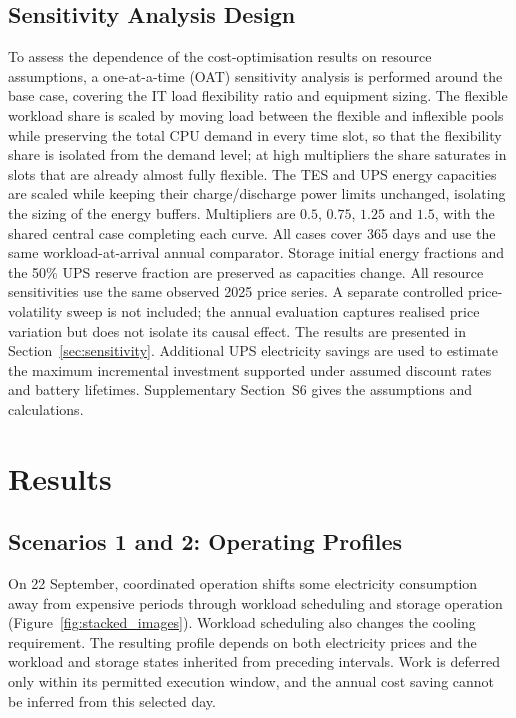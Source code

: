 \documentclass[lettersize,journal]{IEEEtran}
\providecommand{\DIFadd}[1]{{\color{blue}#1}}
\providecommand{\DIFaddbegin}{}
\providecommand{\DIFaddend}{}
\begin{document}
 \DIFaddbegin \subsection{\DIFadd{Sensitivity Analysis Design}}\label{sec:sensitivity-design}
\DIFadd{To assess the dependence of the cost-optimisation results on resource assumptions, a one-at-a-time (OAT) sensitivity analysis is performed around the base case, covering the IT load flexibility ratio and equipment sizing. The flexible workload share is scaled by moving load between the flexible and inflexible pools while preserving the total CPU demand in every time slot, so that the flexibility share is isolated from the demand level; at high multipliers the share saturates in slots that are already almost fully flexible. The TES and UPS energy capacities are scaled while keeping their charge/discharge power limits unchanged, isolating the sizing of }\DIFaddend the  \DIFaddbegin \DIFadd{energy buffers. Multipliers are $0.5$, $0.75$, $1.25$ }\DIFaddend and  \DIFaddbegin \DIFadd{$1.5$, with the shared central case completing each curve. All cases cover 365 days and use the same workload-at-arrival annual comparator. Storage initial energy fractions and the 50\% UPS reserve fraction are preserved as capacities change. All resource sensitivities use the same observed 2025 price series. A separate controlled price-volatility sweep is not included; the annual evaluation captures realised price variation but does not isolate its causal effect. The results are presented in Section~\ref{sec:sensitivity}. Additional UPS electricity savings are used to estimate the maximum incremental investment supported under assumed discount rates and battery lifetimes. Supplementary Section~S6 gives the assumptions and calculations.
}\section{\DIFadd{Results}}\label{sec:results}

\DIFaddend 

 \DIFaddbegin \subsection{\DIFadd{Scenarios 1 and 2: Operating Profiles}}
\DIFadd{On 22 September, coordinated operation shifts some electricity consumption away from expensive periods through workload scheduling and storage operation (Figure~\ref{fig:stacked_images}). Workload scheduling also changes the cooling requirement. The resulting profile depends on both electricity prices and the workload and storage states inherited from preceding intervals. Work is deferred only within its permitted execution window, and the annual cost saving cannot be inferred from this selected day}\DIFaddend .
\end{document}
